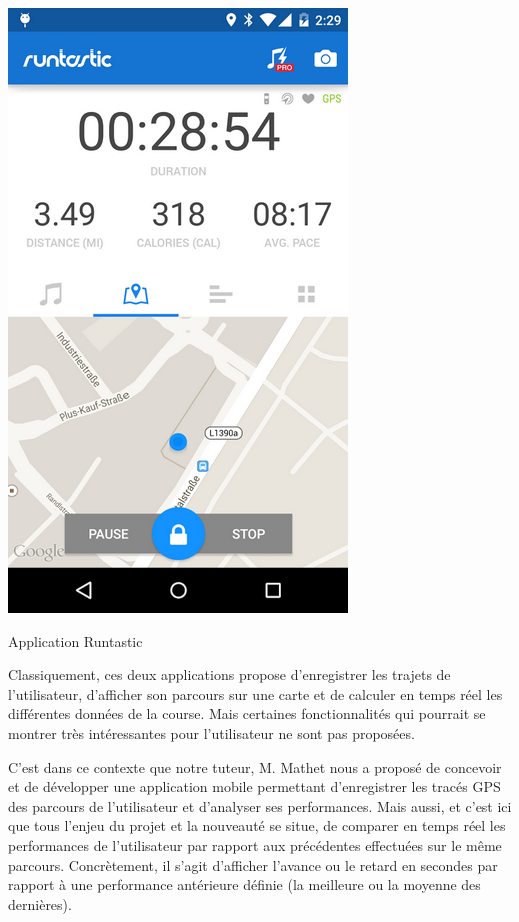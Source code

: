 \begin{multicols}{2}
\begin{img}
  \includegraphics[scale=0.9]{img/Runtastic.png}
  \caption{Application Runtastic}
\end{img}
\end{multicols}

Classiquement, ces deux applications propose d'enregistrer les trajets de l'utilisateur, d'afficher son parcours sur une carte et de calculer en temps réel les différentes données de la course. Mais certaines fonctionnalités qui pourrait se montrer très intéressantes pour l'utilisateur ne sont pas proposées.\bigskip

C'est dans ce contexte que notre tuteur, M. Mathet nous a proposé de concevoir et de développer une application mobile permettant d'enregistrer les tracés GPS des parcours de l'utilisateur et d'analyser ses performances. Mais aussi, et c'est ici que tous l'enjeu du projet et la nouveauté se situe, de comparer en temps réel les performances de l'utilisateur par rapport aux  précédentes effectuées sur le même parcours. Concrètement, il s'agit d'afficher l'avance ou le retard en secondes par rapport à une performance antérieure définie (la meilleure ou la moyenne des dernières). 
